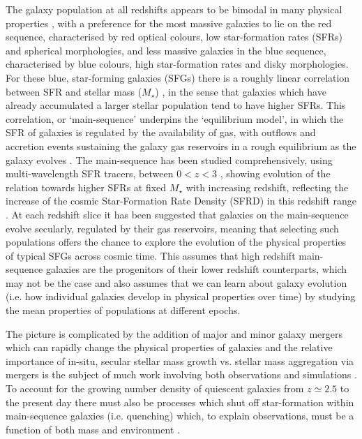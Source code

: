 \documentclass[fleqn,usenatbib]{mnras}
\begin{document}
The galaxy population at all redshifts appears to be bimodal in many physical properties \citep[e.g. as described in][]{Dekel2006}, with a preference for the most massive galaxies to lie on the red sequence, characterised by red optical colours, low star-formation rates (SFRs) and spherical morphologies, and less massive galaxies in the blue sequence, characterised by blue colours, high star-formation rates and disky morphologies. 
For these blue, star-forming galaxies (SFGs) there is a roughly linear correlation between SFR and stellar mass ($M_{\star}$) \citep[e.g.][]{Daddi2007,Noeske2007,Elbaz2007}, in the sense that galaxies which have already accumulated a larger stellar population tend to have higher SFRs.
This correlation, or `main-sequence' underpins the `equilibrium model', in which the SFR of galaxies is regulated by the availability of gas, with outflows and accretion events sustaining the galaxy gas reservoirs in a rough equilibrium as the galaxy evolves \citep[e.g.][]{Dave2012,Lilly2013,Saintonge2013}.
The main-sequence has been studied comprehensively, using multi-wavelength SFR tracers, between $0 < z < 3$ \citep[e.g.][]{Rodighiero2011,Karim2011,Whitaker2012,Behroozi2013b,Whitaker2014,Rodighiero2014,Speagle2014,Pannella2014,Sobral2014,Sparre2015,Lee2015,Schreiber2015,Renzini2015,Nelson2016}, showing evolution of the relation towards higher SFRs at fixed $M_{\star}$ with increasing redshift, reflecting the increase of the cosmic Star-Formation Rate Density (SFRD) in this redshift range \citep{Madau_2014}.
At each redshift slice it has been suggested that galaxies on the main-sequence evolve secularly, regulated by their gas reservoirs, meaning that selecting such populations offers the chance to explore the evolution of the physical properties of typical SFGs across cosmic time.
This assumes that high redshift main-sequence galaxies are the progenitors of their lower redshift counterparts, which may not be the case \citep[e.g.][]{Gladders2013,Kelson2014,Abramson2016b} and also assumes that we can learn about galaxy evolution (i.e. how individual galaxies develop in physical properties over time) by studying the mean properties of populations at different epochs. 

The picture is complicated by the addition of major and minor galaxy mergers which can rapidly change the physical properties of galaxies \citep[e.g.][]{Toomre1977,Lotz2008,Conselice2011,Conselice2014} and the relative importance of in-situ, secular stellar mass growth vs. stellar mass aggregation via mergers is the subject of much work involving both observations and simulations \citep[e.g.][]{Robaina2009,Kaviraj2012,Stott2013,Lofthouse2017,Qu2017}. 
To account for the growing number density of quiescent galaxies from $z\simeq2.5$ to the present day \citep[e.g.][]{Bell2004,Faber2007,Brown2007,Ilbert2010,Brammer2011,Muzzin2013,Buitrago2013} there must also be processes which shut off star-formation within main-sequence galaxies (i.e. quenching) which, to explain observations, must be a function of both mass and environment \citep{Peng2010,Darvish2016}.
\end{document}
